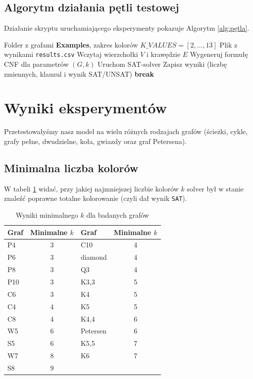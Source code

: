 \documentclass[11pt,a4paper]{article}
\theoremstyle{definition}
\begin{document}
\subsection{Algorytm działania pętli testowej}
Działanie skryptu uruchamiającego eksperymenty pokazuje Algorytm \ref{alg:pętla}.

\begin{algorithm}[H]
\caption{Automatyczne testowanie grafów}\label{alg:pętla}
\begin{algorithmic}[1]
\Require Folder z grafami \textbf{Examples}, zakres kolorów $K\_VALUES = [2, \dots, 13]$
\Ensure Plik z wynikami \texttt{results.csv}
    \State Wczytaj wierzchołki $V$ i krawędzie $E$
        \State Wygeneruj formułę CNF dla parametrów $(G, k)$
        \State Uruchom SAT-solver
        \State Zapisz wyniki (liczbę zmiennych, klauzul i wynik SAT/UNSAT)
            \State \textbf{break} 
        \EndIf
    \EndFor
\EndFor
\end{algorithmic}
\end{algorithm}

\section{Wyniki eksperymentów}
Przetestowałyśmy nasz model na wielu różnych rodzajach grafów (ścieżki, cykle, grafy pełne, dwudzielne, koła, gwiazdy oraz graf Petersena). 

\subsection{Minimalna liczba kolorów}
W tabeli \ref{tab:kolory} widać, przy jakiej najmniejszej liczbie kolorów $k$ solver był w stanie znaleźć poprawne totalne kolorowanie (czyli dał wynik \texttt{SAT}).

\begin{table}[H]
\centering
\caption{Wyniki minimalnego $k$ dla badanych grafów}\label{tab:kolory}
\begin{tabular}{lc|lc}
\toprule
Graf & Minimalne $k$ & Graf & Minimalne $k$ \\
\midrule
P4 & 3 & C10 & 4 \\
P6 & 3 & diamond & 4 \\
P8 & 3 & Q3 & 4 \\
P10 & 3 & K3,3 & 5 \\
C6 & 3 & K4 & 5 \\
C4 & 4 & K5 & 5 \\
C8 & 4 & K4,4 & 6 \\
W5 & 6 & Petersen & 6 \\
S5 & 6 & K5,5 & 7 \\
W7 & 8 & K6 & 7 \\
S8 & 9 & & \\
\bottomrule
\end{tabular}
\end{table}
\end{document}
